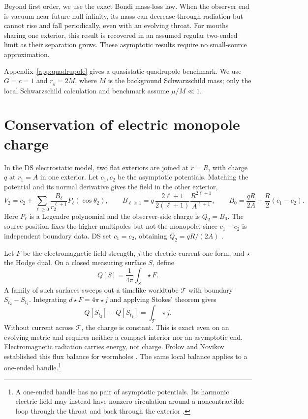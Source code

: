 \documentclass[aps,prd,10pt,onecolumn,nofootinbib,superscriptaddress,floatfix]{revtex4-2}
\begin{document}
Beyond first order, we use the exact Bondi mass-loss law.  When the observer
end is vacuum near future null infinity, its mass can decrease through
radiation but cannot rise and fall periodically, even with an evolving
throat.  For mouths sharing one exterior, this result is recovered in an
assumed regular two-ended limit as their separation grows.  These
asymptotic results require no small-source approximation.

Appendix~\ref{app:quadrupole} gives a quasistatic quadrupole benchmark.
We use $G=c=1$ and $r_g=2M$, where $M$ is the background Schwarzschild
mass; only the local Schwarzschild calculation and benchmark assume
$\mu/M\ll1$.

\section{Conservation of electric monopole charge}
\label{sec:maxwell}

In the DS electrostatic model, two flat exteriors are joined at $r=R$,
with charge $q$ at $r_1=A$ in one exterior.  Let $c_1,c_2$ be the
asymptotic potentials.  Matching the potential and its normal derivative
gives the field in the other exterior,
\begin{equation}
 V_2=c_2+\sum_{\ell\ge0}\frac{B_\ell}{r_2^{\ell+1}}
 P_\ell(\cos\theta_2),\qquad
 B_{\ell\ge1}=q\,\frac{2\ell+1}{2(\ell+1)}
 \frac{R^{2\ell+1}}{A^{\ell+1}},\qquad
 B_0=\frac{qR}{2A}+\frac{R}{2}(c_1-c_2).
 \label{eq:ds-multipoles}
\end{equation}
Here $P_\ell$ is a Legendre polynomial and the observer-side charge is
$Q_2=B_0$.  The source position fixes the higher multipoles but not the
monopole, since $c_1-c_2$ is independent boundary data.
DS set $c_1=c_2$, obtaining $Q_2=qR/(2A)$
\cite{DaiStojkovic2019Observing}.

Let $F$ be the electromagnetic field strength, $j$ the electric current
one-form, and $\star$ the Hodge dual.  On a closed measuring surface $S$,
define
\begin{equation}
 Q[S]=\frac{1}{4\pi}\int_S\star F.
 \label{eq:maxwell-charge}
\end{equation}
A family of such surfaces sweeps out a timelike worldtube $\mathcal T$
with boundary $S_{t_2}-S_{t_1}$.  Integrating $d\star F=4\pi\star j$
and applying Stokes' theorem gives
\begin{equation}
 Q[S_{t_2}]-Q[S_{t_1}]=\int_{\mathcal T}\star j.
 \label{eq:maxwell-balance}
\end{equation}
Without current across $\mathcal T$, the charge is constant.
This is exact even on an evolving metric and requires neither a compact
interior nor an asymptotic end.  Electromagnetic radiation carries
energy, not charge.  Frolov and Novikov established this flux balance
for wormholes \cite{FrolovNovikov1990PhysicalEffects}.
The same local balance applies to a one-ended handle.\footnote{A one-ended
handle has no pair of asymptotic potentials.  Its harmonic electric field
may instead have nonzero circulation around a noncontractible loop through
the throat and back through the exterior
\cite{FrolovNovikov1990PhysicalEffects}.}
\end{document}
